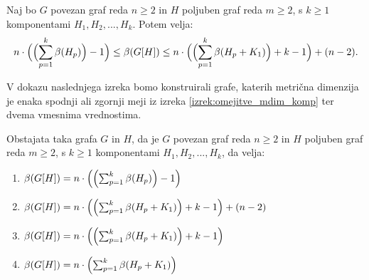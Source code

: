 \documentclass[mat1, tisk]{fmfdelo}
\begin{document}
\begin{izrek} \label{izrek:omejitve_mdim_komp}
    Naj bo $G$ povezan graf reda $n \geq 2$ in $H$ poljuben graf reda $m \geq 2$, s $k \geq 1$ 
    komponentami $H_1, H_2, ... , H_k$. Potem velja:
    $$
    n \cdot \Bigl ( \Bigl ( \sum_{p=1}^{k} \beta(H_p) \Bigr )  - 1  \Bigr ) 
    \leq \beta(G[H]) \leq 
    n \cdot \Bigl ( \Bigl ( \sum_{p=1}^{k} \beta(H_p + K_1) \Bigr ) + k - 1  \Bigr ) + (n-2). 
    $$
    \end{izrek}
    
    
    V dokazu naslednjega izreka bomo konstruirali grafe, katerih metrična dimenzija je enaka
    spodnji ali zgornji meji iz izreka \ref{izrek:omejitve_mdim_komp} ter dvema vmesnima vrednostima.
    
    \begin{izrek} \label{izrek:primeri_mdim_komp}
    Obstajata taka grafa $G$ in $H$, da je $G$ povezan graf reda $n \geq 2$ in $H$ poljuben graf 
    reda $m \geq 2$, s $k \geq 1$ komponentami $H_1, H_2, ... , H_k$, da velja:
    \begin{enumerate}
        \item $\beta(G[H]) = n \cdot \Bigl ( \Bigl ( \sum_{p=1}^{k} \beta(H_p) \Bigr )  - 1  \Bigr )$
        \item $\beta(G[H]) = n \cdot \Bigl ( \Bigl ( \sum_{p=1}^{k} \beta(H_p + K_1) \Bigr ) + k - 1 
         \Bigr ) + (n-2)$
        \item $\beta(G[H]) = n \cdot \Bigl ( \Bigl ( \sum_{p=1}^{k} \beta(H_p + K_1) \Bigr ) + k - 1  
        \Bigr )$
        \item $\beta(G[H]) = n \cdot \Bigl ( \sum_{p=1}^{k} \beta(H_p + K_1) \Bigr ) $
    \end{enumerate}
    \end{izrek}
    
\end{document}

